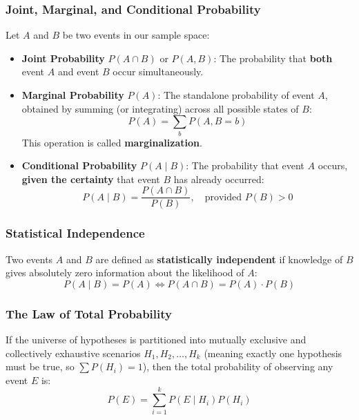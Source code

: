\subsubsection{Joint, Marginal, and Conditional Probability}
Let $A$ and $B$ be two events in our sample space:
\begin{itemize}
    \item \textbf{Joint Probability} $P(A \cap B)$ or $P(A, B)$: The probability that \textbf{both} event $A$ and event $B$ occur simultaneously.
    \item \textbf{Marginal Probability} $P(A)$: The standalone probability of event $A$, obtained by summing (or integrating) across all possible states of $B$:
    \begin{equation}
    P(A) = \sum_{b} P(A, B = b)\label{eq:marginalization}
    \end{equation}
    This operation is called \textbf{marginalization}.
    \item \textbf{Conditional Probability} $P(A \mid B)$: The probability that event $A$ occurs, \textbf{given the certainty} that event $B$ has already occurred:
    \begin{equation}
    P(A \mid B) = \frac{P(A \cap B)}{P(B)}, \quad \text{provided } P(B) > 0\label{eq:conditional_def}
    \end{equation}
\end{itemize}

\subsubsection{Statistical Independence}
Two events $A$ and $B$ are defined as \textbf{statistically independent} if knowledge of $B$ gives absolutely zero information about the likelihood of $A$:
\begin{equation}
P(A \mid B) = P(A) \iff P(A \cap B) = P(A) \cdot P(B)\label{eq:independence_def}
\end{equation}

\subsubsection{The Law of Total Probability}
If the universe of hypotheses is partitioned into mutually exclusive and collectively exhaustive scenarios $H_1, H_2, \dots, H_k$ (meaning exactly one hypothesis must be true, so $\sum P(H_i) = 1$), then the total probability of observing any event $E$ is:
\begin{equation}
P(E) = \sum_{i=1}^{k} P(E \mid H_i) P(H_i)\label{eq:law_of_total_prob}
\end{equation}

